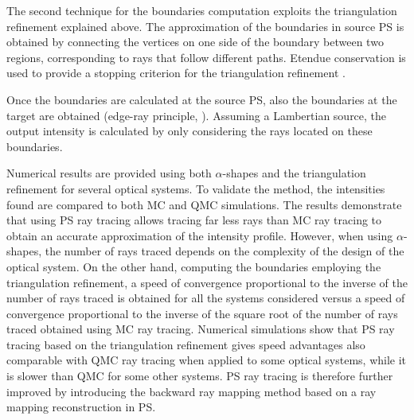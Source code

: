 The second technique for the boundaries computation exploits the triangulation refinement explained above. The approximation of the boundaries in source PS is obtained by connecting the vertices on one side of the boundary between two regions, corresponding to rays that follow different paths.
Etendue conservation is used to provide a stopping criterion for the triangulation refinement \cite{filosa2016ray, filosa2017phase}.  

Once the boundaries are calculated at the source PS, also the boundaries at the target are obtained (edge-ray principle, \cite{Ries:2}). Assuming a Lambertian source, the output intensity is calculated by only considering the rays located on these boundaries. 

Numerical results are provided using both $\alpha$-shapes and the triangulation refinement for several optical systems.
To validate the method, the intensities found are compared to both MC and QMC simulations. The results demonstrate that using PS ray tracing allows tracing far less rays than MC ray tracing to obtain an accurate approximation of the intensity profile. However, when using $\alpha$-shapes, the number of rays traced depends on the complexity of the design of the optical system. On the other hand, computing the boundaries employing the triangulation refinement, a speed of convergence proportional to the inverse of the number of rays traced is obtained for all the systems considered versus a speed of convergence proportional to the inverse of the square root of the number of rays traced obtained using MC ray tracing. Numerical simulations show that PS ray tracing based on the triangulation refinement gives speed advantages also comparable with QMC ray tracing when applied to some optical systems, while it is slower than QMC for some other systems.
PS ray tracing is therefore further improved by introducing the backward ray mapping method based on a ray mapping reconstruction in PS. 

